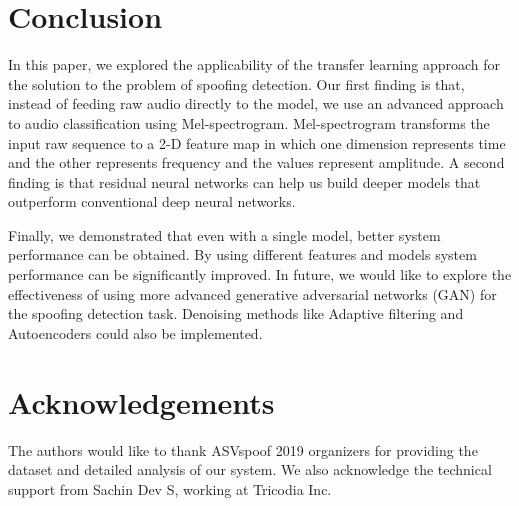 \documentclass[a4paper]{article}
\begin{document}
\section{Conclusion}

   In this paper, we explored the applicability of the transfer learning approach for the solution to the problem of spoofing detection. Our first finding is that, instead of feeding raw audio directly to the model, we use an advanced approach to audio classification using Mel-spectrogram. Mel-spectrogram transforms the input raw sequence to a 2-D feature map in which one dimension represents time and the other represents frequency and the values represent amplitude. A second finding is that residual neural networks can help us build deeper models that outperform conventional deep neural networks. 
   
   Finally, we demonstrated that even with a single model, better system performance can be obtained. By using different features and models system performance can be significantly improved. In future, we would like to explore the effectiveness of using more advanced generative adversarial networks (GAN) for the spoofing detection task. Denoising methods like Adaptive filtering and Autoencoders could also be implemented.  

\section{Acknowledgements}
    The authors would like to thank ASVspoof 2019 organizers for providing the dataset and detailed analysis of our system. We also acknowledge the technical support from Sachin Dev S, working at Tricodia Inc.



\end{document}
